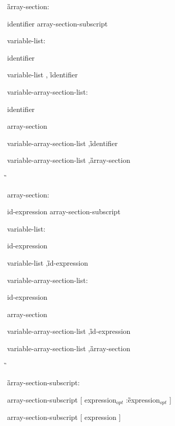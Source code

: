 {\G array-section:

\I identifier array-section-subscript

variable-list:

\I identifier

\I variable-list \C, \G identifier

variable-array-section-list:

\I identifier

\I array-section

\I variable-array-section-list \C ,\G identifier

\I variable-array-section-list \C ,\G array-section

\G\cspecificend

\cppspecificstart

\I array-section:

\I id-expression array-section-subscript

variable-list:

\I id-expression

\I variable-list \C ,\G id-expression

variable-array-section-list:

\I id-expression

\I array-section

\I variable-array-section-list \C ,\G id-expression

\I variable-array-section-list \C ,\G array-section

\G\cppspecificend

\G array-section-subscript:

\I array-section-subscript [ expression$_{opt}$ \C :\G expression$_{opt}$ ]

\I array-section-subscript [ expression ]


\I [ expression ]

} %


